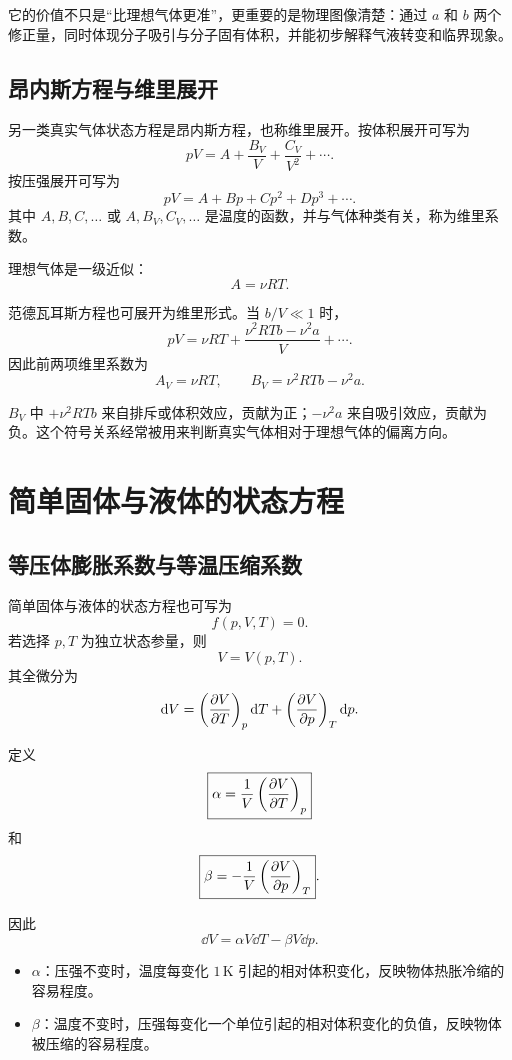\begin{KeyBox}[为什么范德瓦耳斯方程重要]
它的价值不只是“比理想气体更准”，更重要的是物理图像清楚：通过 \(a\) 和 \(b\) 两个修正量，同时体现分子吸引与分子固有体积，并能初步解释气液转变和临界现象。
\end{KeyBox}

\subsection{昂内斯方程与维里展开}

另一类真实气体状态方程是昂内斯方程，也称维里展开。按体积展开可写为
\[
  pV=A+\frac{B_V}{V}+\frac{C_V}{V^2}+\cdots.
\]
按压强展开可写为
\[
  pV=A+Bp+Cp^2+Dp^3+\cdots.
\]
其中 \(A,B,C,\ldots\) 或 \(A,B_V,C_V,\ldots\) 是温度的函数，并与气体种类有关，称为维里系数。

理想气体是一级近似：
\[
  A=\nu RT.
\]

范德瓦耳斯方程也可展开为维里形式。当 \(b/V\ll 1\) 时，
\[
  pV
  =
  \nu RT+
  \frac{\nu^2RTb-\nu^2a}{V}
  +\cdots.
\]
因此前两项维里系数为
\[
  A_V=\nu RT,\qquad
  B_V=\nu^2RTb-\nu^2a.
\]

\begin{WarnBox}[维里系数的物理符号]
\(B_V\) 中 \(+\nu^2RTb\) 来自排斥或体积效应，贡献为正；\(-\nu^2a\) 来自吸引效应，贡献为负。这个符号关系经常被用来判断真实气体相对于理想气体的偏离方向。
\end{WarnBox}

\section{简单固体与液体的状态方程}

\subsection{等压体膨胀系数与等温压缩系数}

简单固体与液体的状态方程也可写为
\[
  f(p,V,T)=0.
\]
若选择 \(p,T\) 为独立状态参量，则
\[
  V=V(p,T).
\]
其全微分为
\[
  \mathop{}\!\mathrm{d} V
  =
  \left(\frac{\partial V}{\partial T}\right)_{p}\mathop{}\!\mathrm{d} T+
  \left(\frac{\partial V}{\partial p}\right)_{T}\mathop{}\!\mathrm{d} p.
\]

定义
\[
  \boxed{
  \alpha
  =
  \frac{1}{V}\left(\frac{\partial V}{\partial T}\right)_{p}
  }
\]
和
\[
  \boxed{
  \beta
  =
  -\frac{1}{V}\left(\frac{\partial V}{\partial p}\right)_{T}
  }.
\]

因此
\[
  \boxed{
  \dd V=\alpha V\dd T-\beta V\dd p
  }.
\]

\begin{KeyBox}
\begin{itemize}
  \item \(\alpha\)：压强不变时，温度每变化 \(1\,\mathrm K\) 引起的相对体积变化，反映物体热胀冷缩的容易程度。
  \item \(\beta\)：温度不变时，压强每变化一个单位引起的相对体积变化的负值，反映物体被压缩的容易程度。
\end{itemize}
\end{KeyBox}

